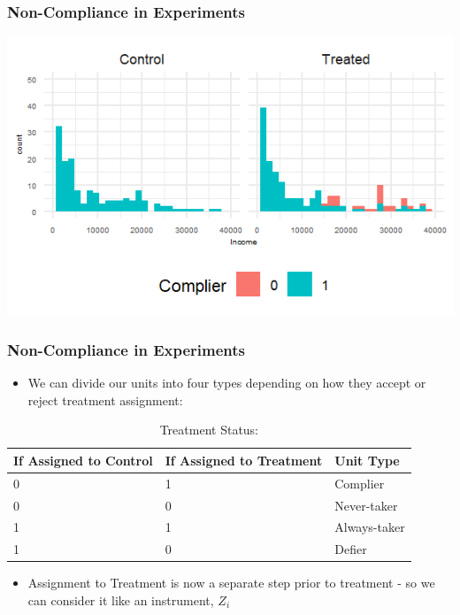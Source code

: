\documentclass[xcolor=x11names,compress]{beamer}\usepackage[]{graphicx}\usepackage[]{color}
\makeatletter
\def\maxwidth{ %
  \ifdim\Gin@nat@width>\linewidth
    \linewidth
  \else
    \Gin@nat@width
  \fi
}
\newenvironment{knitrout}{}{} %
\renewcommand{\(}{\begin{columns}}
\renewcommand{\)}{\end{columns}}
\newcommand{\<}[1]{\begin{column}{#1}}
\renewcommand{\>}{\end{column}}
\makeatother
\begin{document}
\begin{frame}
\frametitle{Non-Compliance in Experiments}

\begin{knitrout}
\color{fgcolor}
\includegraphics[width=\maxwidth]{figure/unnamed-chunk-1-1} 

\end{knitrout}

\end{frame}

\begin{frame}
\frametitle{Non-Compliance in Experiments}
\begin{itemize}
\item We can divide our units into four types depending on how they accept or reject treatment assignment:
\end{itemize}
\begin{table}[htbp]
  \centering
  \caption{Treatment Status: }
    \begin{tabular}{|p{3cm}|p{3cm}|p{3cm}|}
    \hline
    \multicolumn{1}{|p{3cm}|}{\textbf{If Assigned to Control}} & \multicolumn{1}{p{3cm}|}{\textbf{If Assigned to Treatment}} & \textbf{Unit Type} \bigstrut\\
    \hline
    0     & 1     & Complier \bigstrut\\
    \hline
    0     & 0     & Never-taker \bigstrut\\
    \hline
    1     & 1     & Always-taker \bigstrut\\
    \hline
    1     & 0     & Defier \bigstrut\\
    \hline
    \end{tabular}%
  \label{tab:addlabel}%
\end{table}%
\begin{itemize}
\item Assignment to Treatment is now a separate step prior to treatment - so we can consider it like an instrument, $Z_i$
\end{itemize}
\end{frame}
\end{document}
